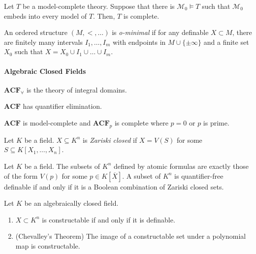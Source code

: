 \documentclass[
	fontsize=10pt, %
]{kaohandt}
\begin{document}
\begin{proposition}
    Let $T$ be a model-complete theory. 
    Suppose that there is $\mathcal{M}_0 \models T$ such that $\mathcal{M}_0$ embeds into every model of $T$. 
    Then, $T$ is complete.
\end{proposition}

\begin{definition}
    An ordered structure $(M,<,\dots)$ is \emph{o-minimal} if
    for any definable $X \subset M$,
    there are finitely many intervals $I_1,\dots,I_m$ with endpoints in $M \cup \{\pm\infty\}$ and a finite set $X_0$ such that $X = X_0 \cup I_1 \cup \dots \cup I_m$.
\end{definition}

\paragraph{\bfseries Algebraic Closed Fields}

\begin{lemma}
    $\mathbf{ACF}_{\forall}$ is the theory of integral domains.
\end{lemma}

\begin{theorem}
    $\mathbf{ACF}$ has quantifier elimination.
\end{theorem}

\begin{corollary}
    $\mathbf{ACF}$ is model-complete and $\mathbf{ACF}_p$ is complete where $p = 0$ or $p$ is prime.
\end{corollary}

Let $K$ be a field.
$X \subseteq K^n$ is \emph{Zariski closed} if $X = V(S)$ for some $S \subseteq K[X_1,\dots,X_n]$.

\begin{lemma}
    Let $K$ be a field.
    The subsets of $K^n$ defined by atomic formulas are exactly those of the form $V(p)$ for some $p \in K[\overline{X}]$.
    A subset of $K^n$ is quantifier-free definable if and only if it is a Boolean combination of Zariski closed sets.
\end{lemma}

\begin{corollary}
    Let $K$ be an algebraically closed field.
    \begin{enumerate}[label = {\roman*)}]
        \item $X \subset K^n$ is constructable if and only if it is definable.
        \item (Chevalley's Theorem) The image of a constructable set under a polynomial map is constructable.
    \end{enumerate}
\end{corollary}
\end{document}
